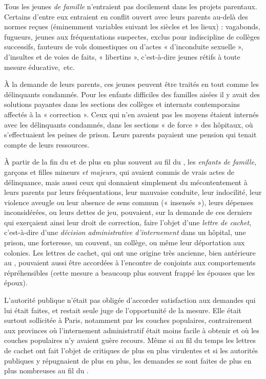  Tous les jeunes \emph{de famille} n'entraient pas docilement dans les projets parentaux. Certains d'entre eux entraient en conflit ouvert avec leurs parents au-delà des normes reçues (éminemment variables suivant les siècles et les lieux) : vagabonds, fugueurs, jeunes aux fréquentations suspectes, exclus pour indiscipline de collèges successifs, fauteurs de vols domestiques ou d'actes « d'inconduite sexuelle », d'insultes et de voies de faits, « libertins », c'est-à-dire jeunes rétifs à toute mesure éducative,~etc. 

 À la demande de leurs parents, ces jeunes peuvent être traités en tout comme les délinquants con\-dam\-nés. Pour les enfants difficiles des familles aisées il y avait des solutions payantes dans les sections des collèges et internats contemporains affectés à la « correction ». Ceux qui n'en avaient pas les moyens étaient internés avec les délinquants condamnés, dans les sections « de force » des hôpitaux, où s'effectuaient les peines de prison. Leurs parents payaient une pension qui tenait compte de leurs ressources. 

 À partir de la fin du  et de plus en plus souvent au fil du , les \emph{enfants de famille}, garçons et filles mineurs \emph{et majeurs}, qui avaient commis de vrais actes de délinquance, mais aussi ceux qui donnaient simplement du mécontentement à leurs parents par leurs fréquentations, leur mauvaise conduite, leur indocilité, leur violence aveugle ou leur absence de sens commun (« insensés »), leurs dépenses inconsidérées, ou leurs dettes de jeu, pouvaient, sur la demande de ces derniers qui exerçaient ainsi leur droit de correction, faire l'objet d'une \emph{lettre de cachet}, c'est-à-dire d'une \emph{décision administrative d'internement} dans un hôpital, une prison, une forteresse, un couvent, un collège, ou même leur déportation aux colonies. Les lettres de cachet, qui ont une origine très ancienne, bien antérieure au , pouvaient aussi être accordées à l'encontre de conjoints aux comportements répréhensibles (cette mesure a beaucoup plus souvent frappé les épouses que les époux). 

 L'autorité publique n'était pas obligée d'accorder satisfaction aux demandes qui lui était faites, et restait seule juge de l'opportunité de la mesure. Elle était surtout sollicitée à Paris, notamment par les couches populaires, contrairement aux provinces où l'internement administratif était moins facile à obtenir et où les couches populaires n'y avaient guère recours. Même si au fil du temps les lettres de cachet ont fait l'objet de critiques de plus en plus virulentes et si les autorités publiques y répugnaient de plus en plus, les demandes se sont faites de plus en plus nombreuses au fil du . 

